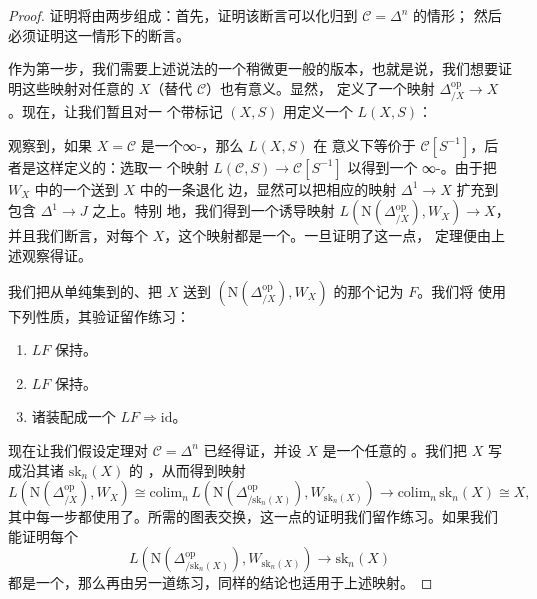 \begin{proof}
证明将由两步组成：首先，证明该断言可以化归到 $\mathcal{C} = \Delta^n$ 的情形；
然后必须证明这一情形下的断言。

作为第一步，我们需要上述说法的一个稍微更一般的版本，也就是说，我们想要证
明这些映射对任意的\trSimplicialSet{} $X$（替代 $\mathcal{C}$）也有意义。显然，
\trInitialVertexMap{}定义了一个映射 $\Delta^{\mathrm{op}}_{/X} \to X$。现在，让我们暂且对一
个带标记\trSimplicialSet{} $(X, S)$ 用\trPushout{}定义一个\trSimplicialSet{}%
$L(X, S)$：
\begin{center}
\end{center}
观察到，如果 $X = \mathcal{C}$ 是一个∞-\trCategory{}，那么 $L(X, S)$ 在%
\trJoyalEquivalence{}意义下等价于 $\mathcal{C}[S^{-1}]$，后者是这样定义的：选取一
个\trInnerAnodyne{}映射 $L(\mathcal{C}, S) \to \mathcal{C}[S^{-1}]$ 以得到一个
∞-\trCategory{}。由于\trInitialVertexMap{}把 $W_X$ 中的一个\trMorphism{}送到 $X$ 中的一条退化
边，显然可以把相应的映射 $\Delta^1 \to X$ 扩充到包含 $\Delta^1 \to J$ 之上。特别
地，我们得到一个诱导映射
$L(\mathrm{N}(\Delta^{\mathrm{op}}_{/X}), W_X) \to X$，并且我们断言，对每个%
\trSimplicialSet{} $X$，这个映射都是一个\trJoyalEquivalence{}。一旦证明了这一点，
定理便由上述观察得证。

我们把从单纯集到\trMarkedSimplicialSet{}的、把 $X$ 送到
$(\mathrm{N}(\Delta^{\mathrm{op}}_{/X}), W_X)$ 的那个\trFunctor{}记为 $F$。我们将
使用下列性质，其验证留作练习：
\begin{enumerate}[label=(\arabic*)]
  \item \trFunctor{} $LF$ 保持\trColimit{}。
  \item \trFunctor{} $LF$ 保持\trMonomorphism{}。
  \item 诸\trInitialVertexMap{}装配成一个\trNaturalTransformation{}%
        $LF \Rightarrow \mathrm{id}$。
\end{enumerate}

现在让我们假设定理对 $\mathcal{C} = \Delta^n$ 已经得证，并设 $X$ 是一个任意的%
\trSimplicialSet{}。我们把 $X$ 写成沿其诸\trSkeleton{} $\mathrm{sk}_n(X)$ 的%
\trColimit{}，从而得到映射
\[
L(\mathrm{N}(\Delta^{\mathrm{op}}_{/X}), W_X)
\cong
\mathrm{colim}_n\,
L(\mathrm{N}(\Delta^{\mathrm{op}}_{/\mathrm{sk}_n(X)}), W_{\mathrm{sk}_n(X)})
\to
\mathrm{colim}_n\, \mathrm{sk}_n(X)
\cong
X,
\]
其中每一步都使用了\trInitialVertexMap{}。所需的图表交换，这一点的证明我们留作练习。如果我们
能证明每个\trInitialVertexMap{}%
\[
L(\mathrm{N}(\Delta^{\mathrm{op}}_{/\mathrm{sk}_n(X)}),
W_{\mathrm{sk}_n(X)})
\to
\mathrm{sk}_n(X)
\]
都是一个\trJoyalEquivalence{}，那么再由另一道练习，同样的结论也适用于上述映射。


\end{proof}

